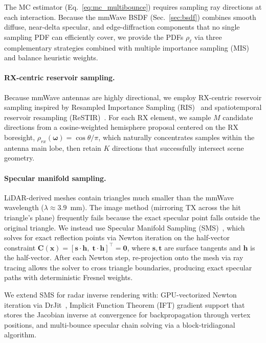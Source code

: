 The MC estimator (Eq.~\eqref{eq:mc_multibounce}) requires sampling ray directions at each interaction. Because the mmWave BSDF (Sec.~\ref{sec:bsdf}) combines smooth diffuse, near-delta specular, and edge-diffraction components that no single sampling PDF can efficiently cover, we provide the PDFs $\rho_\ell$ via three complementary strategies combined with multiple importance sampling (MIS)~\cite{veach1995optimally} and balance heuristic weights.

\paragraph{RX-centric reservoir sampling.}
\label{sec:surface_sampling}
Because mmWave antennas are highly directional, we employ RX-centric reservoir sampling inspired by Resampled Importance Sampling (RIS)~\cite{talbot2005importance} and spatiotemporal reservoir resampling (ReSTIR)~\cite{bitterli2020spatiotemporal, lin2022generalized}. For each RX element, we sample $M$ candidate directions from a cosine-weighted hemisphere proposal centered on the RX boresight, $\rho_{rx}(\boldsymbol{\omega}) = \cos\theta / \pi$, which naturally concentrates samples within the antenna main lobe, then retain $K$ directions that successfully intersect scene geometry.

\paragraph{Specular manifold sampling.}
\label{sec:sms}
LiDAR-derived meshes contain triangles much smaller than the mmWave wavelength ($\lambda \approx 3.9$~mm). The image method (mirroring TX across the hit triangle's plane) frequently fails because the exact specular point falls outside the original triangle. We instead use Specular Manifold Sampling (SMS)~\cite{zeltner2020specular}, which solves for exact reflection points via Newton iteration on the half-vector constraint $\mathbf{C}(\mathbf{x}) = [\mathbf{s}{\cdot}\mathbf{h},\; \mathbf{t}{\cdot}\mathbf{h}]^\top = \mathbf{0}$, where $\mathbf{s},\mathbf{t}$ are surface tangents and $\mathbf{h}$ is the half-vector. After each Newton step, re-projection onto the mesh via ray tracing allows the solver to cross triangle boundaries, producing exact specular paths with deterministic Fresnel weights.

We extend SMS for radar inverse rendering with: GPU-vectorized Newton iteration via DrJit~\cite{jakob2022dr}, Implicit Function Theorem (IFT) gradient support that stores the Jacobian inverse at convergence for backpropagation through vertex positions, and multi-bounce specular chain solving via a block-tridiagonal algorithm.

